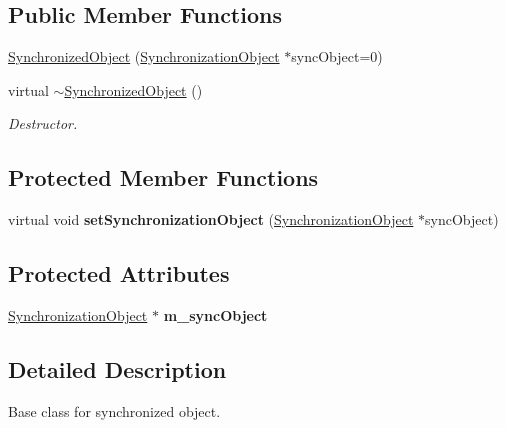 \subsection*{Public Member Functions}
\begin{DoxyCompactItemize}
\item 
\hyperlink{class_synchronized_object_a9ae8017720af72aac92964f23b55d6f1}{Synchronized\-Object} (\hyperlink{class_synchronized_object_1_1_synchronization_object}{Synchronization\-Object} $\ast$sync\-Object=0)
\item 
\hypertarget{class_synchronized_object_ae2c081d2e252b35a49edbf887579cfe0}{virtual \hyperlink{class_synchronized_object_ae2c081d2e252b35a49edbf887579cfe0}{$\sim$\-Synchronized\-Object} ()}\label{class_synchronized_object_ae2c081d2e252b35a49edbf887579cfe0}

\begin{DoxyCompactList}\small\item\em Destructor. \end{DoxyCompactList}\end{DoxyCompactItemize}
\subsection*{Protected Member Functions}
\begin{DoxyCompactItemize}
\item 
\hypertarget{class_synchronized_object_a72f0856ba79569fea9907916e085c555}{virtual void {\bfseries set\-Synchronization\-Object} (\hyperlink{class_synchronized_object_1_1_synchronization_object}{Synchronization\-Object} $\ast$sync\-Object)}\label{class_synchronized_object_a72f0856ba79569fea9907916e085c555}

\end{DoxyCompactItemize}
\subsection*{Protected Attributes}
\begin{DoxyCompactItemize}
\item 
\hypertarget{class_synchronized_object_a51605ed5ba10c06e795f21a98ea5ef37}{\hyperlink{class_synchronized_object_1_1_synchronization_object}{Synchronization\-Object} $\ast$ {\bfseries m\-\_\-sync\-Object}}\label{class_synchronized_object_a51605ed5ba10c06e795f21a98ea5ef37}

\end{DoxyCompactItemize}


\subsection{Detailed Description}
Base class for synchronized object. 

